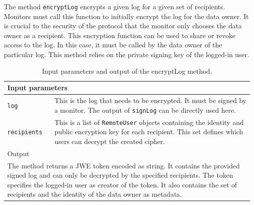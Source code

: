 \documentclass[../main.tex]{subfiles}
\begin{document}
The method \verb|encryptLog| encrypts a given log for a given set of recipients.
Monitors must call this function to initially encrypt the log for the data owner.
It is crucial to the security of the protocol that the monitor only chooses the data owner as a recipient. 
This encryption function can be used to share or revoke access to the log.
In this case, it must be called by the data owner of the particular log. 
This method relies on the private signing key of the logged-in user.
\begin{table}[ht]
    \centering
    \begin{tabular}{|p{3cm}p{10cm}|}
        \hline
        \multicolumn{2}{|l|}{Input parameters}    \\ \hline
        \verb|log|              & This is the log that needs to be encrypted. It must be signed by a monitor. The output of \verb|signLog| can be directly used here.           \\
        \verb|recipients|       & This is a list of \verb|RemoteUser| objects containing the identity and public encryption key for each recipient. This set defines which users can decrypt the created cipher.           \\ \hline
        \multicolumn{2}{|l|}{Output}   \\ \hline
        \multicolumn{2}{|p{13cm}|}{The method returns a JWE token encoded as string. It contains the provided signed log and can only be decrypted by the specified recipients. The token specifies the logged-in user as creator of the token. It also contains the set of recipients and the identity of the data owner as metadata.} \\ \hline
    \end{tabular}
    \caption[Signature of encryptLog]{Input parameters and output of the encryptLog method.}
\end{table}
\end{document}
